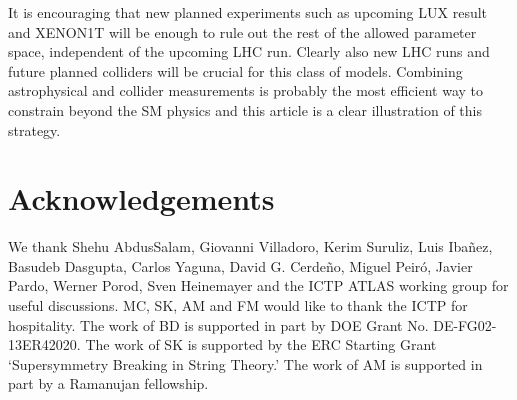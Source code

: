 \documentclass[11pt,a4paper]{article}
\begin{document}
It is encouraging that new planned experiments such as upcoming LUX result and XENON1T will be enough to rule out the rest of the allowed parameter space, independent of the upcoming LHC run. Clearly also new LHC runs and future planned colliders will be crucial for this class of models.
Combining astrophysical and collider measurements is probably the most efficient way to constrain beyond the SM physics and this article is a clear illustration of this strategy.


\section*{Acknowledgements}

We thank Shehu AbdusSalam, Giovanni Villadoro, Kerim Suruliz, Luis Ibañez, Basudeb Dasgupta, Carlos Yaguna, David G. Cerdeño, Miguel Peiró, Javier Pardo, Werner Porod, Sven Heinemayer and the ICTP ATLAS working group  for useful discussions.
MC, SK, AM and FM would like to thank the ICTP for hospitality.
The work of BD is supported in part by DOE Grant No. DE-FG02-13ER42020. The work of SK is supported by the ERC Starting Grant `Supersymmetry Breaking in String Theory.' The work of AM is supported in part by a Ramanujan fellowship.
\end{document}
